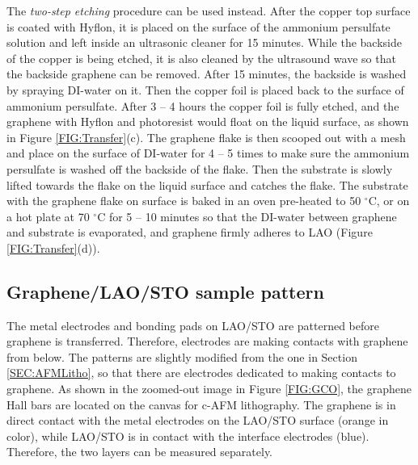 \documentclass[pdflatex, sectionletters, 12pt]{pittetd}    %
\begin{document}
The \emph{two-step etching} procedure can be used instead. After the copper top surface is coated with Hyflon, it is placed on the surface of the ammonium persulfate solution and left inside an ultrasonic cleaner for 15 minutes. While the backside of the copper is being etched, it is also cleaned by the ultrasound wave so that the backside graphene can be removed. After 15 minutes, the backside is washed by spraying DI-water on it. Then the copper foil is placed back to the surface of ammonium persulfate. After 3 -- 4 hours the copper foil is fully etched, and the graphene with Hyflon and photoresist would float on the liquid surface, as shown in Figure \ref{FIG:Transfer}(c). The graphene flake is then scooped out with a mesh and place on the surface of DI-water for 4 -- 5 times to make sure the ammonium persulfate is washed off the backside of the flake. Then the substrate is slowly lifted towards the flake on the liquid surface and catches the flake. The substrate with the graphene flake on surface is baked in an oven pre-heated to 50 $^{\circ}$C, or on a hot plate at 70 $^{\circ}$C for 5 -- 10 minutes so that the DI-water between graphene and substrate is evaporated, and graphene firmly adheres to LAO (Figure \ref{FIG:Transfer}(d)).

\subsection{Graphene/LAO/STO sample pattern}

The metal electrodes and bonding pads on LAO/STO are patterned before graphene is transferred. Therefore, electrodes are making contacts with graphene from below. The patterns are slightly modified from the one in Section \ref{SEC:AFMLitho}, so that there are electrodes dedicated to making contacts to graphene. As shown in the zoomed-out image in Figure \ref{FIG:GCO}, the graphene Hall bars are located on the canvas for c-AFM lithography. The graphene is in direct contact with the metal electrodes on the LAO/STO surface (orange in color), while LAO/STO is in contact with the interface electrodes (blue). Therefore, the two layers can be measured separately. 
\end{document}
